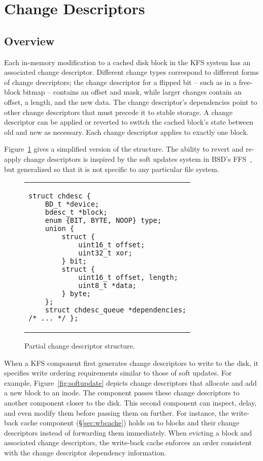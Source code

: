 \section {Change Descriptors}
\label{sec:chdescs}

\subsection {Overview}
Each in-memory modification to a cached disk block in the KFS system has an
associated change descriptor. Different change types correspond to different
forms of change descriptors; the change descriptor for a flipped bit -- such as
in a free-block bitmap -- contains an offset and mask, while larger changes
contain an offset, a length, and the new data. The change descriptor's
dependencies point to other change descriptors that must precede it to stable
storage. A change descriptor can be applied or reverted to switch the cached
block's state between old and new as necessary. Each change descriptor applies
to exactly one block.

Figure~\ref{fig:chdesc} gives a simplified version of the structure. The ability
to revert and re-apply change descriptors is inspired by the soft updates system
in BSD's FFS~\cite{ganger00soft}, but generalized so that it is not specific to
any particular file system.

\begin{figure}
\vskip-14pt
\begin{tabular}{@{\hskip0.58in}p{2in}@{}}
\begin{scriptsize}
\begin{verbatim}
struct chdesc {
    BD_t *device;
    bdesc_t *block;
    enum {BIT, BYTE, NOOP} type;
    union {
        struct {
            uint16_t offset;
            uint32_t xor;
        } bit;
        struct {
            uint16_t offset, length;
            uint8_t *data;
        } byte;
    };
    struct chdesc_queue *dependencies;
/* ... */ };
\end{verbatim}
\end{scriptsize}
\end{tabular}
\vspace{-10pt}
\caption{\label{fig:chdesc} Partial change descriptor structure.}
\end{figure}

When a KFS component first generates change descriptors to write to the disk, it
specifies write ordering requirements similar to those of soft updates. For
example, Figure~\ref{fig:softupdate} depicts change descriptors that allocate
and add a new block to an inode. The component passes these change descriptors
to another component closer to the disk. This second component can inspect,
delay, and even modify them before passing them on further. For instance, the
write-back cache component (\S\ref{sec:wbcache}) holds on to blocks and their
change descriptors instead of forwarding them immediately. When evicting a block
and associated change descriptors, the write-back cache enforces an order
consistent with the change descriptor dependency information.

